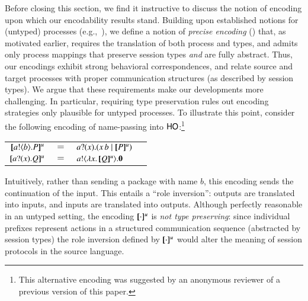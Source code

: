 Before closing this section, we find it instructive to discuss the notion of encoding 
upon which our 
encodability results stand.
Building upon established notions for (untyped) processes (e.g.,~\cite{DBLP:journals/iandc/Gorla10}), 
we define a notion of \emph{precise encoding} () that, as motivated earlier,  
requires the translation of both process and types, and 
admits only process mappings that preserve session types
\emph{and} are fully abstract. Thus, our encodings 
exhibit   strong behavioral correspondences, and 
 relate source and target processes with  
proper communication structures (as described by session types).
We argue that these requirements make our developments more challenging.
In particular, requiring type preservation rules out encoding strategies only plausible for untyped processes.
To illustrate this point,
consider the  following encoding of %
name-passing 
into $\mathsf{HO}$:\footnote{This alternative  encoding was suggested by an anonymous reviewer of a previous version of this paper.} %
\begin{center}
\begin{tabular}{rcll}
  $[\!\![a ! \langle b \rangle . P]\!\!]^u$	&$=$&	$a ? (x) .( x\, {b} \;|\; [\!\![P]\!\!]^u)$ \\
  $[\!\![a ? (x) . Q]\!\!]^u$	&$=$&	$a ! \langle \lambda x.\,[\!\![Q]\!\!]^u \rangle . \mathbf{0}$
\end{tabular}
\end{center}
Intuitively, 
rather than sending a package with name $b$, 
this encoding sends the continuation of the input. This entails  a 
``role inversion'': outputs are translated into inputs, and inputs are translated into outputs. 
Although perfectly reasonable in an  {untyped setting}, the encoding $[\!\![\cdot]\!\!]^u$  
is \emph{not type preserving}: 
since 
individual  prefixes represent actions in a structured communication sequence (abstracted by session types)
the role inversion defined by $[\!\![\cdot]\!\!]^u$ would alter the meaning of session protocols in the source language.



